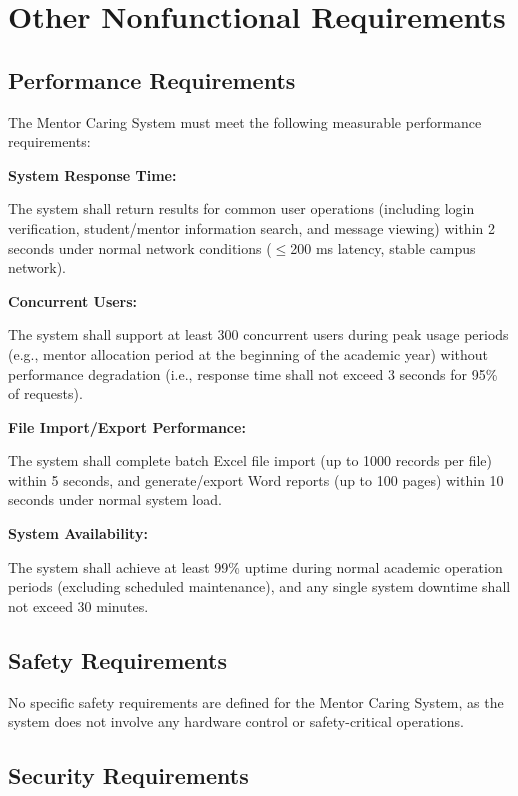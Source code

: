 \section{Other Nonfunctional Requirements}

\subsection{Performance Requirements}

The Mentor Caring System must meet the following measurable performance requirements:

\textbf{System Response Time:}

The system shall return results for common user operations (including login verification, student/mentor information search, and message viewing) within 2 seconds under normal network conditions ($\leq$200 ms latency, stable campus network).

\textbf{Concurrent Users:}

The system shall support at least 300 concurrent users during peak usage periods (e.g., mentor allocation period at the beginning of the academic year) without performance degradation (i.e., response time shall not exceed 3 seconds for 95\% of requests).

\textbf{File Import/Export Performance:}

The system shall complete batch Excel file import (up to 1000 records per file) within 5 seconds, and generate/export Word reports (up to 100 pages) within 10 seconds under normal system load.

\textbf{System Availability:}

The system shall achieve at least 99\% uptime during normal academic operation periods (excluding scheduled maintenance), and any single system downtime shall not exceed 30 minutes.

\subsection{Safety Requirements}

No specific safety requirements are defined for the Mentor Caring System, as the system does not involve any hardware control or safety-critical operations.

\subsection{Security Requirements}


